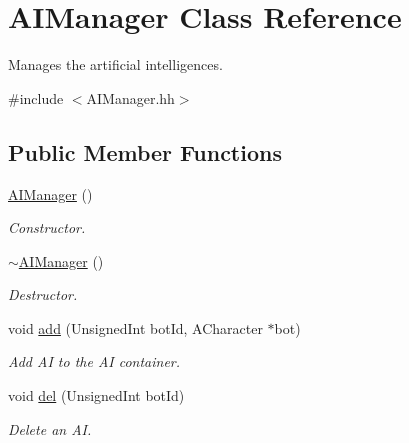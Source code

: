 \hypertarget{classAIManager}{}\section{A\+I\+Manager Class Reference}
\label{classAIManager}


Manages the artificial intelligences.  




{\ttfamily \#include $<$A\+I\+Manager.\+hh$>$}

\subsection*{Public Member Functions}
\begin{DoxyCompactItemize}
\item 
\mbox{\label{classAIManager_a02d9effe0270bd2a353acdf45f11b360}} 
\hyperlink{classAIManager_a02d9effe0270bd2a353acdf45f11b360}{A\+I\+Manager} ()
\begin{DoxyCompactList}\small\item\em Constructor. \end{DoxyCompactList}\item 
\mbox{\label{classAIManager_a07762cbbf5de6bffd7499f86987a8dd5}} 
\hyperlink{classAIManager_a07762cbbf5de6bffd7499f86987a8dd5}{$\sim$\+A\+I\+Manager} ()
\begin{DoxyCompactList}\small\item\em Destructor. \end{DoxyCompactList}\item 
void \hyperlink{classAIManager_a4722a3719db2ff5ee2f754b539ee2c17}{add} (Unsigned\+Int bot\+Id, A\+Character $\ast$bot)
\begin{DoxyCompactList}\small\item\em Add AI to the AI container. \end{DoxyCompactList}\item 
\mbox{\label{classAIManager_aa191acd26d99a2db1de62206ad052b4d}} 
void \hyperlink{classAIManager_aa191acd26d99a2db1de62206ad052b4d}{del} (Unsigned\+Int bot\+Id)
\begin{DoxyCompactList}\small\item\em Delete an AI. \end{DoxyCompactList}\item 
\mbox{\label{classAIManager_aeb412f42b60c126594377d739440b632}} 

\end{DoxyCompactItemize}

